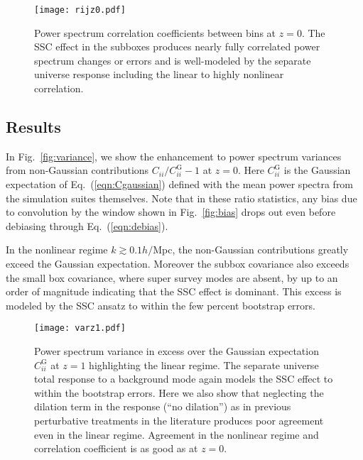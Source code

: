 \documentclass[prd,twocolumn,amsmath,amssymb,floatfix,superscriptaddress]{revtex4-1}
\begin{document}
\begin{figure}[t]
    \centering
    \texttt{[image: rijz0.pdf]}
    \caption{\footnotesize Power spectrum correlation coefficients between bins at $z=0$.   The SSC effect in the subboxes produces nearly fully correlated power spectrum changes or errors and is well-modeled by the separate universe response including the linear to highly 
    nonlinear correlation.     }
    \label{fig:correlation}
\end{figure}


\subsection{Results}
\label{sec:SSCresults}

In Fig.~\ref{fig:variance}, we show the  enhancement to power spectrum variances from non-Gaussian contributions
$C_{ii}/C^\text{G}_{ii}-1$ at $z=0$.  Here
$C_{ii}^\text{G}$ is the   Gaussian expectation of Eq.~(\ref{eqn:Cgaussian}) defined with 
{the mean} power spectra
from the simulation suites themselves.   Note that in these ratio statistics, any bias
due to convolution by the window shown in Fig.~\ref{fig:bias} drops out even before
debiasing through Eq.~(\ref{eqn:debias}).  

In the nonlinear regime $k \gtrsim 0.1 h/$Mpc, the non-Gaussian contributions
greatly exceed the Gaussian expectation.   Moreover the subbox covariance also exceeds the small box covariance, where super survey modes are absent,
by up to an order of magnitude indicating that the SSC effect is dominant.   This excess is modeled by the SSC ansatz to within the few percent bootstrap errors. 


\begin{figure}[t]
    \centering
    \texttt{[image: varz1.pdf]}
    \caption{\footnotesize Power spectrum variance in excess over the Gaussian
    expectation $C_{ii}^\text{G}$ at $z=1$ highlighting the linear regime.    The separate universe
    total response to a background mode again models the SSC effect to within the bootstrap
    errors.   Here we also show that neglecting the dilation term in the response
    (``no dilation'') as in previous perturbative treatments in the literature produces poor agreement 
    even in the linear regime.   
    Agreement in the nonlinear regime and correlation coefficient is as good as at $z=0$.  }
    \label{fig:z1}
\end{figure}
\end{document}
